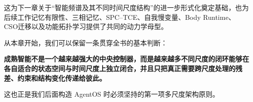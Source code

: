 这为下一章关于“智能频谱及其不同时间尺度结构”的进一步形式化奠定基础，也为后续工作记忆有限性、三相记忆、SPC--TCE、自我慢变量、Body Runtime、CSO迁移以及功能拓扑学习提供了共同的动力学母型。

从本章开始，我们可以保留一条贯穿全书的基本判断：

\begin{proposition*}
\bfseries
成熟智能不是一个越来越强大的中央控制器，而是越来越多不同尺度的闭环能够在各自适合的状态空间与时间尺度上独立闭合，并且只把真正需要跨尺度处理的残差、约束和结构变化传递给彼此。
\end{proposition*}

这也正是我们后面构造 AgentOS 时必须坚持的第一项多尺度架构原则。

